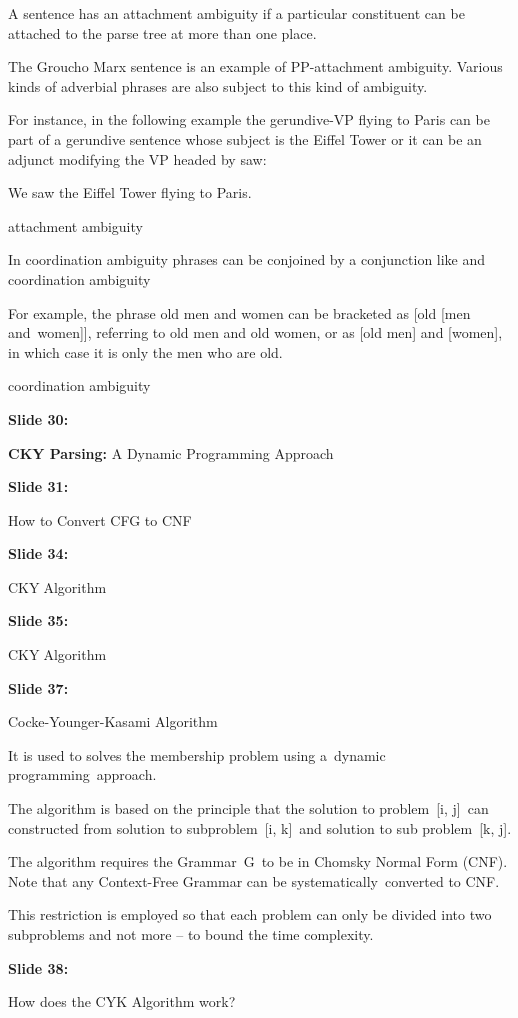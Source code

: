 \documentclass[11pt,a4paper]{article}
\begin{document}
A  sentence has an attachment ambiguity if a particular constituent can be attached to the parse tree at more than one place.

The Groucho Marx sentence is an example of PP-attachment ambiguity. Various kinds of adverbial phrases are also subject to this kind of ambiguity.

For instance, in the following example the gerundive-VP flying to Paris can be part of a gerundive sentence whose subject is the Eiffel Tower or it can be an adjunct modifying the VP headed by saw:

We saw the Eiffel Tower flying to Paris.

attachment ambiguity

In coordination ambiguity phrases can be conjoined by a conjunction like and coordination ambiguity

For example, the phrase old men and women can be bracketed as [old [men and women]], referring to old men and old women, or as [old men] and [women], in which case it is only the men who are old.

coordination ambiguity

\textbf{Slide 30:}

\textbf{CKY Parsing:}  A Dynamic Programming Approach

\textbf{Slide 31:}

How to Convert CFG to CNF

\textbf{Slide 34:}

CKYAlgorithm

\textbf{Slide 35:}

CKYAlgorithm

\textbf{Slide 37:}

Cocke-Younger-Kasami Algorithm

It is used to solves the membership problem using a dynamic programming approach.

The algorithm is based on the principle that the solution to problem [i, j] can constructed from solution to subproblem [i, k] and solution to sub problem [k, j].

The algorithm requires the Grammar G to be in Chomsky Normal Form (CNF). Note that any Context-Free Grammar can be systematically converted to CNF.

This restriction is employed so that each problem can only be divided into two subproblems and not more – to bound the time complexity.

\textbf{Slide 38:}

How does the CYK Algorithm work?
\end{document}
